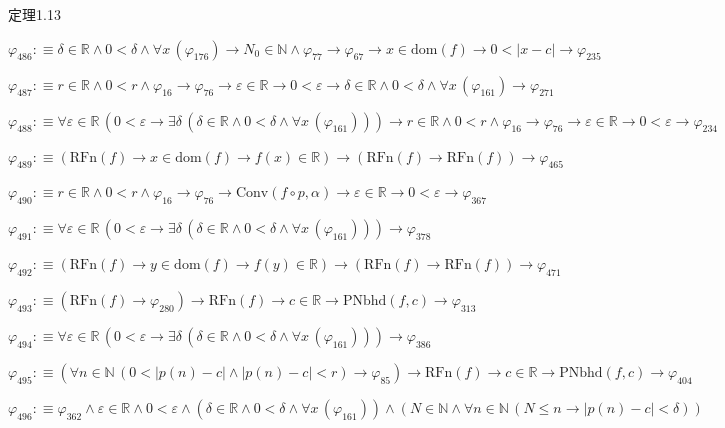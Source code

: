 \begin{fullproof}{定理1.13}
\begin{abbrevlist}
\item $\varphi_{486} :\equiv \delta \in \mathbb{R} \land 0 < \delta \land \forall x\,(\varphi_{176}) \to N_{0} \in \mathbb{N} \land \varphi_{77} \to \varphi_{67} \to x \in \mathrm{dom}(f) \to 0 < \lvert x - c \rvert \to \varphi_{235}$
\item $\varphi_{487} :\equiv r \in \mathbb{R} \land 0 < r \land \varphi_{16} \to \varphi_{76} \to \varepsilon \in \mathbb{R} \to 0 < \varepsilon \to \delta \in \mathbb{R} \land 0 < \delta \land \forall x\,(\varphi_{161}) \to \varphi_{271}$
\item $\varphi_{488} :\equiv \forall \varepsilon \in \mathbb{R}\,(0 < \varepsilon \to \exists \delta\,(\delta \in \mathbb{R} \land 0 < \delta \land \forall x\,(\varphi_{161}))) \to r \in \mathbb{R} \land 0 < r \land \varphi_{16} \to \varphi_{76} \to \varepsilon \in \mathbb{R} \to 0 < \varepsilon \to \varphi_{234}$
\item $\varphi_{489} :\equiv (\mathrm{RFn}(f) \to x \in \mathrm{dom}(f) \to f(x) \in \mathbb{R}) \to (\mathrm{RFn}(f) \to \mathrm{RFn}(f)) \to \varphi_{465}$
\item $\varphi_{490} :\equiv r \in \mathbb{R} \land 0 < r \land \varphi_{16} \to \varphi_{76} \to \mathrm{Conv}(f \circ p,\alpha) \to \varepsilon \in \mathbb{R} \to 0 < \varepsilon \to \varphi_{367}$
\item $\varphi_{491} :\equiv \forall \varepsilon \in \mathbb{R}\,(0 < \varepsilon \to \exists \delta\,(\delta \in \mathbb{R} \land 0 < \delta \land \forall x\,(\varphi_{161}))) \to \varphi_{378}$
\item $\varphi_{492} :\equiv (\mathrm{RFn}(f) \to y \in \mathrm{dom}(f) \to f(y) \in \mathbb{R}) \to (\mathrm{RFn}(f) \to \mathrm{RFn}(f)) \to \varphi_{471}$
\item $\varphi_{493} :\equiv (\mathrm{RFn}(f) \to \varphi_{280}) \to \mathrm{RFn}(f) \to c \in \mathbb{R} \to \mathrm{PNbhd}(f,c) \to \varphi_{313}$
\item $\varphi_{494} :\equiv \forall \varepsilon \in \mathbb{R}\,(0 < \varepsilon \to \exists \delta\,(\delta \in \mathbb{R} \land 0 < \delta \land \forall x\,(\varphi_{161}))) \to \varphi_{386}$
\item $\varphi_{495} :\equiv (\forall n \in \mathbb{N}\,(0 < \lvert p(n) - c \rvert \land \lvert p(n) - c \rvert < r) \to \varphi_{85}) \to \mathrm{RFn}(f) \to c \in \mathbb{R} \to \mathrm{PNbhd}(f,c) \to \varphi_{404}$
\item $\varphi_{496} :\equiv \varphi_{362} \land \varepsilon \in \mathbb{R} \land 0 < \varepsilon \land (\delta \in \mathbb{R} \land 0 < \delta \land \forall x\,(\varphi_{161})) \land (N \in \mathbb{N} \land \forall n \in \mathbb{N}\,(N \leq n \to \lvert p(n) - c \rvert < \delta))$

\end{abbrevlist}
\end{fullproof}

